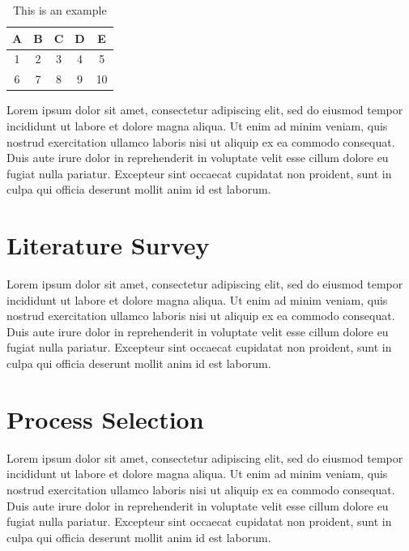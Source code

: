 \documentclass[a4paper,12pt]{report}
\begin{document}
\vspace*{-0.8\baselineskip}
\begin{table}[h]
\centering
\caption{This is an example}
\begin{tabular}{|c|c|c|c|c|}
\hline
A & B & C & D & E  \\
\hline
1 & 2 & 3 & 4 & 5  \\
\hline
6 & 7 & 8 & 9 & 10 \\
\hline
\end{tabular}
\end{table}
\vspace*{-0.5\baselineskip}

Lorem ipsum dolor sit amet, consectetur adipiscing elit, sed do eiusmod tempor incididunt ut labore et dolore magna aliqua. Ut enim ad minim veniam, quis nostrud exercitation ullamco laboris nisi ut aliquip ex ea commodo consequat. Duis aute irure dolor in reprehenderit in voluptate velit esse cillum dolore eu fugiat nulla pariatur. Excepteur sint occaecat cupidatat non proident, sunt in culpa qui officia deserunt mollit anim id est laborum.

\newpage

\section[Literature Survey]{Literature Survey}
Lorem ipsum dolor sit amet, consectetur adipiscing elit, sed do eiusmod tempor incididunt ut labore et dolore magna aliqua. Ut enim ad minim veniam, quis nostrud exercitation ullamco laboris nisi ut aliquip ex ea commodo consequat. Duis aute irure dolor in reprehenderit in voluptate velit esse cillum dolore eu fugiat nulla pariatur. Excepteur sint occaecat cupidatat non proident, sunt in culpa qui officia deserunt mollit anim id est laborum.
\newpage

\section[Process Selection]{Process Selection}
Lorem ipsum dolor sit amet, consectetur adipiscing elit, sed do eiusmod tempor incididunt ut labore et dolore magna aliqua. Ut enim ad minim veniam, quis nostrud exercitation ullamco laboris nisi ut aliquip ex ea commodo consequat. Duis aute irure dolor in reprehenderit in voluptate velit esse cillum dolore eu fugiat nulla pariatur. Excepteur sint occaecat cupidatat non proident, sunt in culpa qui officia deserunt mollit anim id est laborum.
\newpage
\end{document}

